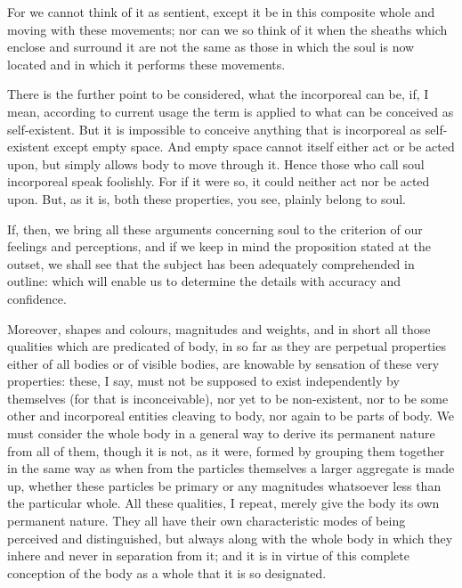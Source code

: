 \documentclass{stex}
\begin{document}
For we cannot think of it as sentient, except it be in this composite whole and moving with these movements; nor can we so think of it when the sheaths which enclose and surround it are not the same as those in which the soul is now located and in which it performs these movements.

There is the further point to be considered, what the incorporeal can be, if, I mean, according to current usage the term is applied to what can be conceived as self-existent.
But it is impossible to conceive anything that is incorporeal as self-existent except empty space.
And empty space cannot itself either act or be acted upon, but simply allows body to move through it.
Hence those who call soul incorporeal speak foolishly.
For if it were so, it could neither act nor be acted upon.
But, as it is, both these properties, you see, plainly belong to soul.

If, then, we bring all these arguments concerning soul to the criterion of our feelings and perceptions, and if we keep in mind the proposition stated at the outset, we shall see that the subject has been adequately comprehended in outline: which will enable us to determine the details with accuracy and confidence.

Moreover, shapes and colours, magnitudes and weights, and in short all those qualities which are predicated of body, in so far as they are perpetual properties either of all bodies or of visible bodies, are knowable by sensation of these very properties: these, I say, must not be supposed to exist independently by themselves (for that is inconceivable), nor yet to be non-existent, nor to be some other and incorporeal entities cleaving to body, nor again to be parts of body.
We must consider the whole body in a general way to derive its permanent nature from all of them, though it is not, as it were, formed by grouping them together in the same way as when from the particles themselves a larger aggregate is made up, whether these particles be primary or any magnitudes whatsoever less than the particular whole.
All these qualities, I repeat, merely give the body its own permanent nature.
They all have their own characteristic modes of being perceived and distinguished, but always along with the whole body in which they inhere and never in separation from it; and it is in virtue of this complete conception of the body as a whole that it is so designated.
\end{document}

